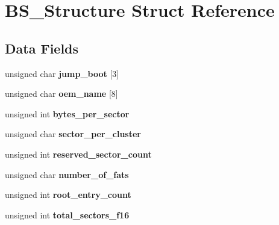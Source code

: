 \hypertarget{struct_b_s___structure}{\section{B\-S\-\_\-\-Structure Struct Reference}
\label{struct_b_s___structure}
}
\subsection*{Data Fields}
\begin{DoxyCompactItemize}
\item 
\hypertarget{struct_b_s___structure_af7b88c2f3cb5650bbdb73fabda5f0674}{unsigned char {\bfseries jump\-\_\-boot} \mbox{[}3\mbox{]}}\label{struct_b_s___structure_af7b88c2f3cb5650bbdb73fabda5f0674}

\item 
\hypertarget{struct_b_s___structure_aad08c3f8e8a444d492cc77be16a79d86}{unsigned char {\bfseries oem\-\_\-name} \mbox{[}8\mbox{]}}\label{struct_b_s___structure_aad08c3f8e8a444d492cc77be16a79d86}

\item 
\hypertarget{struct_b_s___structure_a3e87bb5541e531bdbdcb1b21f5f7c265}{unsigned int {\bfseries bytes\-\_\-per\-\_\-sector}}\label{struct_b_s___structure_a3e87bb5541e531bdbdcb1b21f5f7c265}

\item 
\hypertarget{struct_b_s___structure_aa4cc2cff4de57c64aca35fa45afb44af}{unsigned char {\bfseries sector\-\_\-per\-\_\-cluster}}\label{struct_b_s___structure_aa4cc2cff4de57c64aca35fa45afb44af}

\item 
\hypertarget{struct_b_s___structure_a6b95f71f476efbe73f4c9e1cd384433a}{unsigned int {\bfseries reserved\-\_\-sector\-\_\-count}}\label{struct_b_s___structure_a6b95f71f476efbe73f4c9e1cd384433a}

\item 
\hypertarget{struct_b_s___structure_a936efb3c062a0937937880913f8f8e1e}{unsigned char {\bfseries number\-\_\-of\-\_\-fats}}\label{struct_b_s___structure_a936efb3c062a0937937880913f8f8e1e}

\item 
\hypertarget{struct_b_s___structure_a8061d7cdf1bcc5b1af654d1f9d0b5d47}{unsigned int {\bfseries root\-\_\-entry\-\_\-count}}\label{struct_b_s___structure_a8061d7cdf1bcc5b1af654d1f9d0b5d47}

\item 
\hypertarget{struct_b_s___structure_a6b387bfbfebf4c1947c85b3f49a9cf2a}{unsigned int {\bfseries total\-\_\-sectors\-\_\-f16}}\label{struct_b_s___structure_a6b387bfbfebf4c1947c85b3f49a9cf2a}


\end{DoxyCompactItemize}
